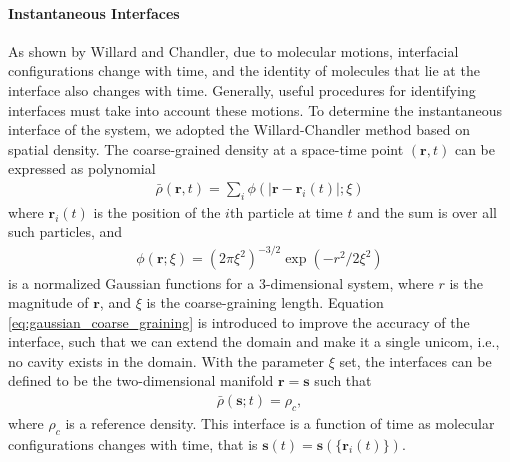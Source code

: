 \paragraph{Instantaneous Interfaces}\label{para:II}
As shown by Willard and Chandler, due to molecular motions, interfacial configurations
change with time, and the identity of molecules that lie at the interface also changes with time. 
Generally, useful procedures for identifying interfaces must take into account these motions\cite{Willard2010}. 
To determine the instantaneous interface of the system, we adopted the Willard-Chandler method based on spatial density\cite{Willard2010}.
The coarse-grained density at a space-time point $(\mathbf{r},t)$ can be expressed as polynomial
\begin{eqnarray}
\bar{\rho}(\mathbf{r}, t)=\sum_{i} \phi(|\mathbf{r}-\mathbf{r}_{i}(t)|; \xi) 
\end{eqnarray}
where ${\mathbf{r}}_i(t)$ is the position of the $i$th particle at time $t$ and the sum is over all such particles, and 
\begin{eqnarray}
\phi(\mathbf{r};\xi)=(2 \pi \xi^{2})^{-3/ 2} \exp (-r^{2} / 2 \xi^{2}) 
\label{eq:gaussian_coarse_graining}
\end{eqnarray} 
is a normalized Gaussian functions for a 3-dimensional system, where $r$ is the magnitude of ${\mathbf r}$, and $\xi$ is the coarse-graining length.
Equation \ref{eq:gaussian_coarse_graining} is introduced to improve the accuracy of the interface, such that we can extend the domain and make it a single unicom,
i.e., no cavity exists in the domain.
With the parameter $\xi$ set, the interfaces can be defined to be the two-dimensional manifold ${\mathbf r} = {\mathbf s}$ such that
\begin{eqnarray}
\bar\rho(\mathbf{s};t)= \rho_c, 
\label{eq:rho_c}
\end{eqnarray} 
where $\rho_c$ is a reference density. This interface is a function of time as molecular configurations changes with time, that is 
${\mathbf s}(t) = {\mathbf s}(\{{\mathbf r}_i(t)\})$. 

